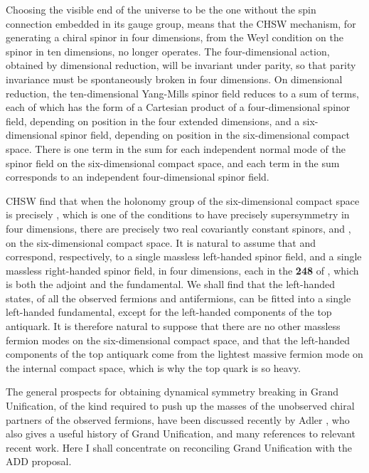 \documentclass[a4paper,12pt,oneside]{article}
\begin{document}
Choosing the visible end of the universe to be the one without the
spin connection embedded in its gauge group, means that the CHSW
mechanism, for generating a chiral spinor in four dimensions, from 
the Weyl condition on the spinor in ten dimensions, no longer
operates.  The four-dimensional action, obtained by dimensional
reduction, will be invariant under parity, so that parity invariance
must be spontaneously broken in four dimensions.  On dimensional 
reduction, the ten-dimensional Yang-Mills spinor field reduces to a 
sum of terms, each of which has the form of a Cartesian product of 
a four-dimensional spinor field, depending on position in the four 
extended dimensions, and a six-dimensional spinor field, depending 
on position in the six-dimensional compact space.  There is one 
term in the sum for each independent normal mode of the spinor 
field on the six-dimensional compact space, and each term in the 
sum corresponds to an independent four-dimensional spinor field.

CHSW find that when the holonomy group of the six-dimensional 
compact space is precisely \coordHE{}, which is one of the 
conditions to have precisely \coordHE{} supersymmetry in four 
dimensions, there are precisely two real covariantly constant 
spinors, \myHighlight{$\eta$}\coordHE{} and \coordHE{}, on the six-dimensional compact 
space.  It is natural to assume that \coordHE{} and \coordHE{} correspond, 
respectively, to a single massless left-handed spinor field, and a 
single massless right-handed spinor field, in four dimensions, each 
in the \textbf{248} of \coordHE{}, which is both the adjoint and 
the fundamental.  We shall find that the left-handed states, of all 
the observed fermions and antifermions, can be fitted into a single
left-handed \coordHE{} fundamental, except for the left-handed
components of the top antiquark.  It is therefore natural to suppose
that there are no other massless fermion modes on the 
six-dimensional compact space, and that the left-handed components 
of the top antiquark come from the lightest massive fermion mode on 
the internal compact space, which is why the top quark is so heavy.

The general prospects for obtaining dynamical symmetry breaking
in \coordHE{} Grand Unification, of the kind required to push up
the masses of the unobserved chiral partners of the observed 
fermions, have been discussed recently by Adler \cite{Adler}, who
also gives a useful history of \coordHE{} Grand Unification, and
many references to relevant recent work.  Here I shall concentrate
on reconciling \coordHE{} Grand Unification with the ADD 
proposal.
\end{document}
